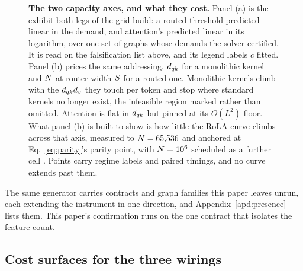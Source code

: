 \begin{figure}[H]
\centering
\begin{minipage}[t]{0.48\linewidth}
\centering\footnotesize
{}
\end{minipage}\hfill
\begin{minipage}[t]{0.48\linewidth}
\centering\footnotesize
{}
\end{minipage}
\caption{\textbf{The two capacity axes, and what they cost.} Panel (a) is the exhibit both legs of the grid build: a routed threshold predicted linear in the demand, and attention's predicted linear in its logarithm, over one set of graphs whose demands the solver certified. It is read on the falsification list above, and its legend labels $c$ fitted. Panel (b) prices the same addressing, $d_{qk}$ for a monolithic kernel and $N$ at router width $S$ for a routed one. Monolithic kernels climb with the $d_{qk} d_v$ they touch per token and stop where standard kernels no longer exist, the infeasible region marked rather than omitted. Attention is flat in $d_{qk}$ but pinned at its $O(L^2)$ floor. What panel (b) is built to show is how little the RoLA curve climbs across that axis, measured to $N = 65{,}536$ and anchored at Eq.~\eqref{eq:parity}'s parity point, with $N = 10^6$ scheduled as a further cell . Points carry regime labels and paired timings, and no curve extends past them.}
\label{fig:axis}
\end{figure}

The same generator carries contracts and graph families this paper leaves unrun, each extending the instrument in one direction, and Appendix~\ref{apd:presence} lists them. This paper's confirmation runs on the one contract that isolates the feature count.


\subsection{Cost surfaces for the three wirings}
\label{sec:sparsify}

